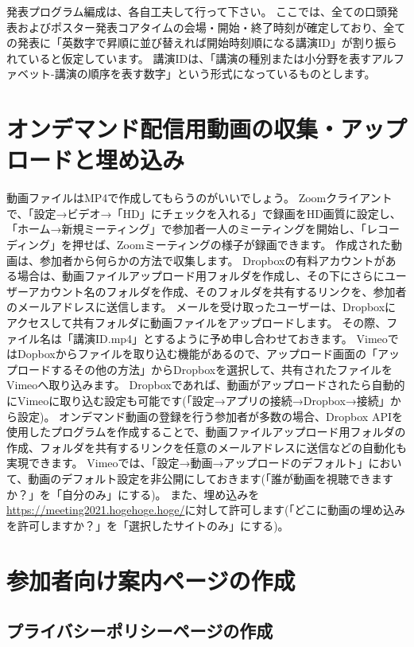 \documentclass[titlepage,10pt,a4paper,uplatex]{jsbook}
\begin{document}
発表プログラム編成は、各自工夫して行って下さい。
ここでは、全ての口頭発表およびポスター発表コアタイムの会場・開始・終了時刻が確定しており、全ての発表に「英数字で昇順に並び替えれば開始時刻順になる講演ID」が割り振られていると仮定しています。
講演IDは、「講演の種別または小分野を表すアルファベット-講演の順序を表す数字」という形式になっているものとします。

\section{オンデマンド配信用動画の収集・アップロードと埋め込み}

動画ファイルはMP4で作成してもらうのがいいでしょう。
Zoomクライアントで、「設定→ビデオ→「HD」にチェックを入れる」で録画をHD画質に設定し、「ホーム→新規ミーティング」で参加者一人のミーティングを開始し、「レコーディング」を押せば、Zoomミーティングの様子が録画できます。
作成された動画は、参加者から何らかの方法で収集します。
Dropboxの有料アカウントがある場合は、動画ファイルアップロード用フォルダを作成し、その下にさらにユーザーアカウント名のフォルダを作成、そのフォルダを共有するリンクを、参加者のメールアドレスに送信します。
メールを受け取ったユーザーは、Dropboxにアクセスして共有フォルダに動画ファイルをアップロードします。
その際、ファイル名は「講演ID.mp4」とするように予め申し合わせておきます。
VimeoではDopboxからファイルを取り込む機能があるので、アップロード画面の「アップロードするその他の方法」からDropboxを選択して、共有されたファイルをVimeoへ取り込みます。
Dropboxであれば、動画がアップロードされたら自動的にVimeoに取り込む設定も可能です(「設定→アプリの接続→Dropbox→接続」から設定)。
オンデマンド動画の登録を行う参加者が多数の場合、Dropbox APIを使用したプログラムを作成することで、動画ファイルアップロード用フォルダの作成、フォルダを共有するリンクを任意のメールアドレスに送信などの自動化も実現できます。
Vimeoでは、「設定→動画→アップロードのデフォルト」において、動画のデフォルト設定を非公開にしておきます(「誰が動画を視聴できますか？」を「自分のみ」にする)。
また、埋め込みを\url{https://meeting2021.hogehoge.hoge/}に対して許可します(「どこに動画の埋め込みを許可しますか？」を「選択したサイトのみ」にする)。

\section{参加者向け案内ページの作成}

\subsection{プライバシーポリシーページの作成}
\end{document}
